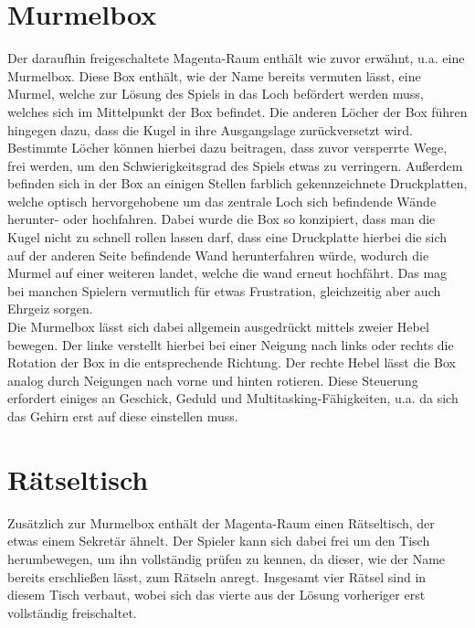 \section{Murmelbox}
Der daraufhin freigeschaltete Magenta-Raum enthält wie zuvor erwähnt, u.a. eine Murmelbox. Diese Box enthält, wie der Name bereits vermuten lässt, eine Murmel, welche zur Lösung des Spiels in das Loch befördert werden muss, welches sich im Mittelpunkt der Box befindet. Die anderen Löcher der Box führen hingegen dazu, dass die Kugel in ihre Ausgangslage zurückversetzt wird. Bestimmte Löcher können hierbei dazu beitragen, dass zuvor versperrte Wege, frei werden, um den Schwierigkeitsgrad des Spiels etwas zu verringern. Außerdem befinden sich in der Box an einigen Stellen farblich gekennzeichnete Druckplatten, welche optisch hervorgehobene um das zentrale Loch sich befindende Wände herunter- oder hochfahren. Dabei wurde die Box so konzipiert, dass man die Kugel nicht zu schnell rollen lassen darf, dass eine Druckplatte hierbei die sich auf der anderen Seite befindende Wand herunterfahren würde, wodurch die Murmel auf einer weiteren landet, welche die wand erneut hochfährt. Das mag bei manchen Spielern vermutlich für etwas Frustration, gleichzeitig aber auch Ehrgeiz sorgen.\\
Die Murmelbox lässt sich dabei allgemein ausgedrückt mittels zweier Hebel bewegen. Der linke verstellt hierbei bei einer Neigung nach links oder rechts die Rotation der Box in die entsprechende Richtung. Der rechte Hebel lässt die Box analog durch Neigungen nach vorne und hinten rotieren. Diese Steuerung erfordert einiges an Geschick, Geduld und Multitasking-Fähigkeiten, u.a. da sich das Gehirn erst auf diese einstellen muss.

\section{Rätseltisch}
Zusätzlich zur Murmelbox enthält der Magenta-Raum einen Rätseltisch, der etwas einem Sekretär ähnelt. Der Spieler kann sich dabei frei um den Tisch herumbewegen, um ihn vollständig prüfen zu kennen, da dieser, wie der Name bereits erschließen lässt, zum Rätseln anregt. Insgesamt vier Rätsel sind in diesem Tisch verbaut, wobei sich das vierte aus der Lösung vorheriger erst vollständig freischaltet.\\
